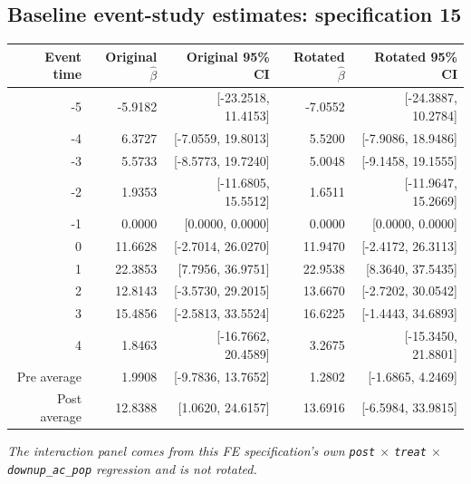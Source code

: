 \documentclass[10pt]{article}
\begin{document}
\subsection*{Baseline event-study estimates: specification 15}
\begin{center}
\scriptsize
\begin{tabular}{r rr rr}
\toprule
Event time & Original $\hat\beta$ & Original 95\% CI & Rotated $\hat\beta$ & Rotated 95\% CI \\
\midrule
-5 & -5.9182 & [-23.2518, 11.4153] & -7.0552 & [-24.3887, 10.2784] \\
-4 & 6.3727 & [-7.0559, 19.8013] & 5.5200 & [-7.9086, 18.9486] \\
-3 & 5.5733 & [-8.5773, 19.7240] & 5.0048 & [-9.1458, 19.1555] \\
-2 & 1.9353 & [-11.6805, 15.5512] & 1.6511 & [-11.9647, 15.2669] \\
-1 & 0.0000 & [0.0000, 0.0000] & 0.0000 & [0.0000, 0.0000] \\
0 & 11.6628 & [-2.7014, 26.0270] & 11.9470 & [-2.4172, 26.3113] \\
1 & 22.3853 & [7.7956, 36.9751] & 22.9538 & [8.3640, 37.5435] \\
2 & 12.8143 & [-3.5730, 29.2015] & 13.6670 & [-2.7202, 30.0542] \\
3 & 15.4856 & [-2.5813, 33.5524] & 16.6225 & [-1.4443, 34.6893] \\
4 & 1.8463 & [-16.7662, 20.4589] & 3.2675 & [-15.3450, 21.8801] \\
\midrule
Pre average & 1.9908 & [-9.7836, 13.7652] & 1.2802 & [-1.6865, 4.2469] \\
Post average & 12.8388 & [1.0620, 24.6157] & 13.6916 & [-6.5984, 33.9815] \\
\bottomrule
\end{tabular}
\end{center}
\medskip
\textit{The interaction panel comes from this FE specification's own \texttt{post} $\times$ \texttt{treat} $\times$ \texttt{downup\_ac\_pop} regression and is not rotated.}
\clearpage
\end{document}
